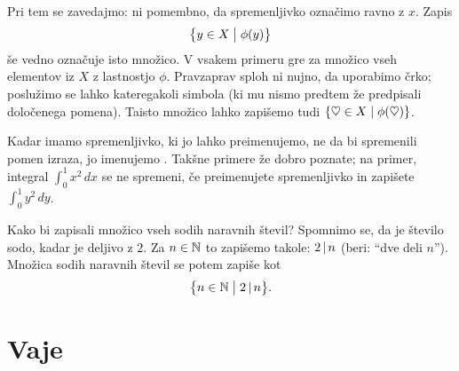 Pri tem se zavedajmo: ni pomembno, da spremenljivko označimo ravno z $x$. Zapis
\[\set[1]{y \in X}{\phi(y)}\]
še vedno označuje isto množico. V vsakem primeru gre za množico vseh elementov iz $X$ z lastnostjo $\phi$. Pravzaprav sploh ni nujno, da uporabimo črko; poslužimo se lahko kateregakoli simbola (ki mu nismo predtem že predpisali določenega pomena). Taisto množico lahko zapišemo tudi $\set{\heartsuit \in X}{\phi(\heartsuit)}$.

Kadar imamo spremenljivko, ki jo lahko preimenujemo, ne da bi spremenili pomen izraza, jo imenujemo . Takšne primere že dobro poznate; na primer, integral $\int_0^1 x^2 \,dx$ se ne spremeni, če preimenujete spremenljivko in zapišete $\int_0^1 y^2 \,dy$.

\begin{zgled}
Kako bi zapisali množico vseh sodih naravnih števil? Spomnimo se, da je število sodo, kadar je deljivo z $2$. Za $n \in \mathbb{N}$ to zapišemo takole: $2 \,|\, n$ (beri: ``dve deli $n$''). Množica sodih naravnih števil se potem zapiše kot
\[\set[1]{n \in \NN}{2 \divides n}.\]
\end{zgled}


\section{Vaje}


